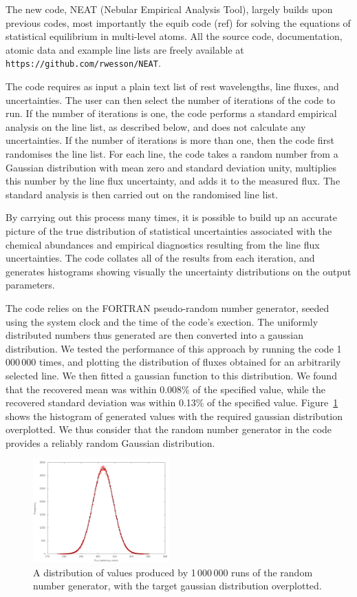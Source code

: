 \documentclass[useAMS,usenatbib]{mn2e}
\begin{document}
The new code, NEAT (Nebular Empirical Analysis Tool), largely builds upon previous codes, most importantly the {\sc equib} code (ref) for solving the equations of statistical equilibrium in multi-level atoms.  All the source code, documentation, atomic data and example line lists are freely available at \texttt{https://github.com/rwesson/NEAT}.

The code requires as input a plain text list of rest wavelengths, line fluxes, and uncertainties.  The user can then select the number of iterations of the code to run.  If the number of iterations is one, the code performs a standard empirical analysis on the line list, as described below, and does not calculate any uncertainties.  If the number of iterations is more than one, then the code first randomises the line list.  For each line, the code takes a random number from a Gaussian distribution with mean zero and standard deviation unity, multiplies this number by the line flux uncertainty, and adds it to the measured flux.  The standard analysis is then carried out on the randomised line list.

By carrying out this process many times, it is possible to build up an accurate picture of the true distribution of statistical uncertainties associated with the chemical abundances and empirical diagnostics resulting from the line flux uncertainties. The code collates all of the results from each iteration, and generates histograms showing visually the uncertainty distributions on the output parameters.

The code relies on the FORTRAN pseudo-random number generator, seeded using the system clock and the time of the code's exection.  The uniformly distributed numbers thus generated are then converted into a gaussian distribution.  We tested the performance of this approach by running the code 1\,000\,000 times, and plotting the distribution of fluxes obtained for an arbitrarily selected line.  We then fitted a gaussian function to this distribution.  We found that the recovered mean was within 0.008\% of the specified value, while the recovered standard deviation was within 0.13\% of the specified value.  Figure~\ref{gaussiantest} shows the histogram of generated values with the required gaussian distribution overplotted.  We thus consider that the random number generator in the code provides a reliably random Gaussian distribution.

\begin{figure}
\includegraphics[width=0.47\textwidth]{figures/gaussian_test.png}
\caption{A distribution of values produced by 1\,000\,000 runs of the random number generator, with the target gaussian distribution overplotted.}
\label{gaussiantest}
\end{figure}
\end{document}

